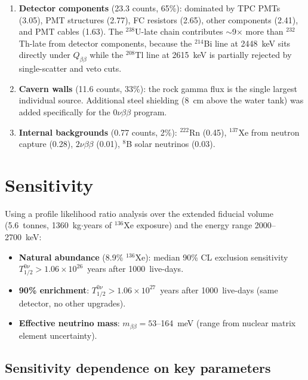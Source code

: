 \documentclass[11pt]{article}
\begin{document}
\begin{enumerate}
\item \textbf{Detector components} (23.3 counts, 65\%): dominated by
  TPC PMTs (3.05), PMT structures (2.77), FC resistors (2.65), other
  components (2.41), and PMT cables (1.63).  The $^{238}$U-late chain
  contributes $\sim$9$\times$ more than $^{232}$Th-late from detector
  components, because the $^{214}$Bi line at 2448~keV sits directly
  under $Q_{\beta\beta}$ while the $^{208}$Tl line at 2615~keV is
  partially rejected by single-scatter and veto cuts.

\item \textbf{Cavern walls} (11.6 counts, 33\%): the rock gamma flux
  is the single largest individual source.  Additional steel shielding
  (8~cm above the water tank) was added specifically for the
  $0\nu\beta\beta$ program.

\item \textbf{Internal backgrounds} (0.77 counts, 2\%): $^{222}$Rn
  (0.45), $^{137}$Xe from neutron capture (0.28), $2\nu\beta\beta$
  (0.01), $^{8}$B solar neutrinos (0.03).
\end{enumerate}

\section{Sensitivity}

Using a profile likelihood ratio analysis over the extended fiducial
volume (5.6~tonnes, 1360~kg$\cdot$years of $^{136}$Xe exposure) and
the energy range 2000--2700~keV:

\begin{itemize}
\item \textbf{Natural abundance} (8.9\% $^{136}$Xe): median 90\% CL
  exclusion sensitivity $T_{1/2}^{0\nu} > 1.06 \times 10^{26}$~years
  after 1000~live-days.

\item \textbf{90\% enrichment}: $T_{1/2}^{0\nu} > 1.06 \times
  10^{27}$~years after 1000~live-days (same detector, no other
  upgrades).

\item \textbf{Effective neutrino mass}: $m_{\beta\beta} = 53$--164~meV
  (range from nuclear matrix element uncertainty).
\end{itemize}

\subsection{Sensitivity dependence on key parameters}
\end{document}
